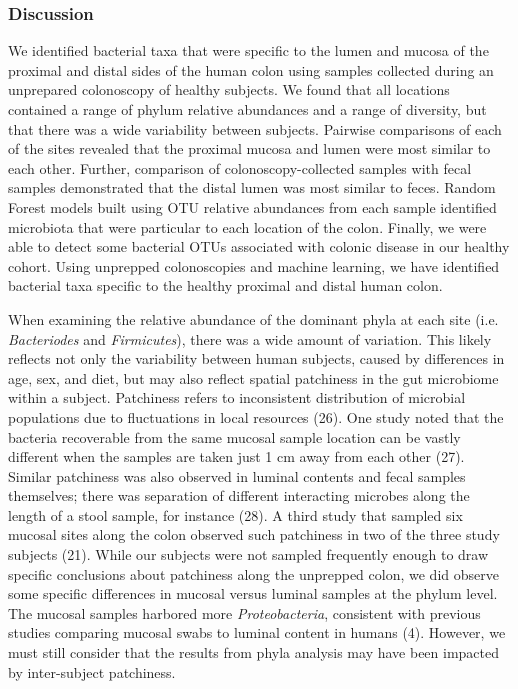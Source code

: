 \documentclass[12pt,]{article}
\begin{document}
\subsubsection{Discussion}\label{discussion}

We identified bacterial taxa that were specific to the lumen and mucosa
of the proximal and distal sides of the human colon using samples
collected during an unprepared colonoscopy of healthy subjects. We found
that all locations contained a range of phylum relative abundances and a
range of diversity, but that there was a wide variability between
subjects. Pairwise comparisons of each of the sites revealed that the
proximal mucosa and lumen were most similar to each other. Further,
comparison of colonoscopy-collected samples with fecal samples
demonstrated that the distal lumen was most similar to feces. Random
Forest models built using OTU relative abundances from each sample
identified microbiota that were particular to each location of the
colon. Finally, we were able to detect some bacterial OTUs associated
with colonic disease in our healthy cohort. Using unprepped
colonoscopies and machine learning, we have identified bacterial taxa
specific to the healthy proximal and distal human colon.

When examining the relative abundance of the dominant phyla at each site
(i.e. \emph{Bacteriodes} and \emph{Firmicutes}), there was a wide amount
of variation. This likely reflects not only the variability between
human subjects, caused by differences in age, sex, and diet, but may
also reflect spatial patchiness in the gut microbiome within a subject.
Patchiness refers to inconsistent distribution of microbial populations
due to fluctuations in local resources (26). One study noted that the
bacteria recoverable from the same mucosal sample location can be vastly
different when the samples are taken just 1 cm away from each other
(27). Similar patchiness was also observed in luminal contents and fecal
samples themselves; there was separation of different interacting
microbes along the length of a stool sample, for instance (28). A third
study that sampled six mucosal sites along the colon observed such
patchiness in two of the three study subjects (21). While our subjects
were not sampled frequently enough to draw specific conclusions about
patchiness along the unprepped colon, we did observe some specific
differences in mucosal versus luminal samples at the phylum level. The
mucosal samples harbored more \emph{Proteobacteria}, consistent with
previous studies comparing mucosal swabs to luminal content in humans
(4). However, we must still consider that the results from phyla
analysis may have been impacted by inter-subject patchiness.
\end{document}
